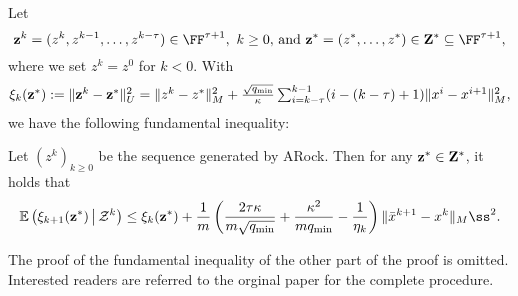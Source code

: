 {Let 
\begin{equation*}%
\vz^k=(z^k,z^{k-1},\ldots,z^{k-\tau})\in \FF^{\tau+1},~k\ge 0,\,\mbox{and}~ \vz^* =(z^*,\ldots,z^*)\in\vZ^*\subseteq\FF^{\tau+1},
\end{equation*}
where we set $z^{k}=z^{0}$ for $k<0$. With
\begin{equation}\label{eqn:xi}
\textstyle \xi_k(\vz^*) := \|\vz^k-\vz^*\|_U^2=\|z^{k} - z^*\|_M^2 +
\frac{\sqrt{q_{\min}}}{\kappa}\sum_{i=k-\tau}^{k-1} (i-(k-\tau)+1) \|
x^{i} - x^{i+1}\|_M^2,
\end{equation}
we have the following fundamental inequality:
\begin{thm}\label{thm:fund_inquality}
Let $(z^k)_{k\geq 0}$ be the sequence generated by ARock. Then for any ${\mathbf{z}}^*\in{\mathbf{Z}}^*$, it holds that %
\begin{equation}\label{eqn:fund_inquality}
\begin{aligned}
\mathbb{E}\left(\xi_{k+1}(\vz^*) \,\big|\, \cZ^k\right)  
\leq  \xi_k(\vz^*)  + \frac{1}{m}
\left(\frac{2\tau\kappa}{m\sqrt{q_{\min}}} +
{\kappa^2\over mq_{\min}} - \frac{1}{ \eta_k}\right)
\|\bar{x}^{k+1} - x^k \|_Mß^2.
\end{aligned}
\end{equation}
\end{thm}

The proof of the fundamental inequality of the other part of the proof is omitted. Interested readers are referred to the orginal paper \cite{Peng_2015_AROCK} for the complete procedure.
}